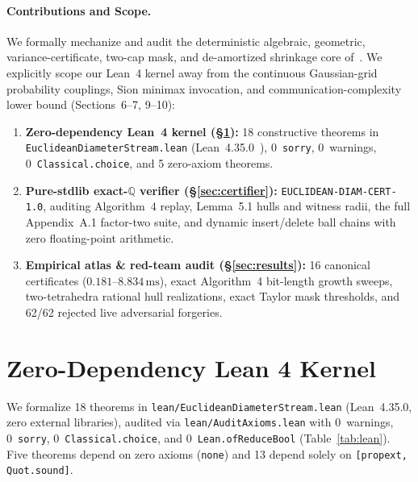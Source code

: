 \documentclass[11pt,twocolumn]{article}
\newcommand{\QQ}{\mathbb{Q}}
\begin{document}
\paragraph{Contributions and Scope.}
We formally mechanize and audit the deterministic algebraic, geometric, variance-certificate, two-cap mask, and de-amortized shrinkage core of~\cite{giliberti2026diameter}. We explicitly scope our Lean~4 kernel away from the continuous Gaussian-grid probability couplings, Sion minimax invocation, and communication-complexity lower bound (Sections~6--7, 9--10):
\begin{enumerate}[leftmargin=*,nosep]
  \item \textbf{Zero-dependency Lean~4 kernel (\S\ref{sec:lean}):} 18 constructive theorems in \texttt{EuclideanDiameterStream.lean} (Lean~4.35.0~\cite{demoura2021lean4}), 0~\texttt{sorry}, 0~warnings, 0~\texttt{Classical.choice}, and 5 zero-axiom theorems.
  \item \textbf{Pure-stdlib exact-\texorpdfstring{$\QQ$}{Q} verifier (\S\ref{sec:certifier}):} \texttt{EUCLIDEAN-DIAM-CERT-1.0}, auditing Algorithm~4 replay, Lemma~5.1 hulls and witness radii, the full Appendix~A.1 factor-two suite, and dynamic insert/delete ball chains with zero floating-point arithmetic.
  \item \textbf{Empirical atlas \& red-team audit (\S\ref{sec:results}):} 16 canonical certificates ($0.181$--$8.834\,\mathrm{ms}$), exact Algorithm~4 bit-length growth sweeps, two-tetrahedra rational hull realizations, exact Taylor mask thresholds, and 62/62 rejected live adversarial forgeries.
\end{enumerate}

\section{Zero-Dependency Lean 4 Kernel}\label{sec:lean}
We formalize 18 theorems in \texttt{lean/EuclideanDiameterStream.lean} (Lean~4.35.0, zero external libraries), audited via \texttt{lean/AuditAxioms.lean} with 0~warnings, 0~\texttt{sorry}, 0~\texttt{Classical.choice}, and 0~\texttt{Lean.ofReduceBool} (Table~\ref{tab:lean}). Five theorems depend on zero axioms (\texttt{none}) and 13 depend solely on \texttt{[propext, Quot.sound]}.
\end{document}
